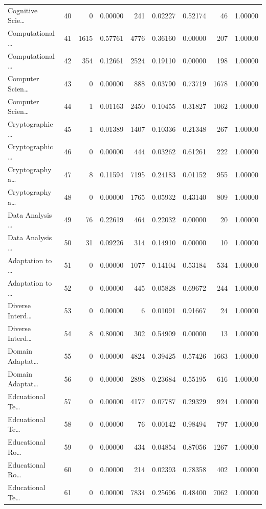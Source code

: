 \begin{table}
\begin{tabular}{lrrrrrrrr}
Cognitive Scie… & 40 & 0 & 0.00000 & 241 & 0.02227 & 0.52174 & 46 & 1.00000 \\
Computational … & 41 & 1615 & 0.57761 & 4776 & 0.36160 & 0.00000 & 207 & 1.00000 \\
Computational … & 42 & 354 & 0.12661 & 2524 & 0.19110 & 0.00000 & 198 & 1.00000 \\
Computer Scien… & 43 & 0 & 0.00000 & 888 & 0.03790 & 0.73719 & 1678 & 1.00000 \\
Computer Scien… & 44 & 1 & 0.01163 & 2450 & 0.10455 & 0.31827 & 1062 & 1.00000 \\
Cryptographic … & 45 & 1 & 0.01389 & 1407 & 0.10336 & 0.21348 & 267 & 1.00000 \\
Cryptographic … & 46 & 0 & 0.00000 & 444 & 0.03262 & 0.61261 & 222 & 1.00000 \\
Cryptography a… & 47 & 8 & 0.11594 & 7195 & 0.24183 & 0.01152 & 955 & 1.00000 \\
Cryptography a… & 48 & 0 & 0.00000 & 1765 & 0.05932 & 0.43140 & 809 & 1.00000 \\
Data Analysis … & 49 & 76 & 0.22619 & 464 & 0.22032 & 0.00000 & 20 & 1.00000 \\
Data Analysis … & 50 & 31 & 0.09226 & 314 & 0.14910 & 0.00000 & 10 & 1.00000 \\
Adaptation to … & 51 & 0 & 0.00000 & 1077 & 0.14104 & 0.53184 & 534 & 1.00000 \\
Adaptation to … & 52 & 0 & 0.00000 & 445 & 0.05828 & 0.69672 & 244 & 1.00000 \\
Diverse Interd… & 53 & 0 & 0.00000 & 6 & 0.01091 & 0.91667 & 24 & 1.00000 \\
Diverse Interd… & 54 & 8 & 0.80000 & 302 & 0.54909 & 0.00000 & 13 & 1.00000 \\
Domain Adaptat… & 55 & 0 & 0.00000 & 4824 & 0.39425 & 0.57426 & 1663 & 1.00000 \\
Domain Adaptat… & 56 & 0 & 0.00000 & 2898 & 0.23684 & 0.55195 & 616 & 1.00000 \\
Edcuational Te… & 57 & 0 & 0.00000 & 4177 & 0.07787 & 0.29329 & 924 & 1.00000 \\
Edcuational Te… & 58 & 0 & 0.00000 & 76 & 0.00142 & 0.98494 & 797 & 1.00000 \\
Educational Ro… & 59 & 0 & 0.00000 & 434 & 0.04854 & 0.87056 & 1267 & 1.00000 \\
Educational Ro… & 60 & 0 & 0.00000 & 214 & 0.02393 & 0.78358 & 402 & 1.00000 \\
Educational Te… & 61 & 0 & 0.00000 & 7834 & 0.25696 & 0.48400 & 7062 & 1.00000 \\

\end{tabular}
\end{table}
